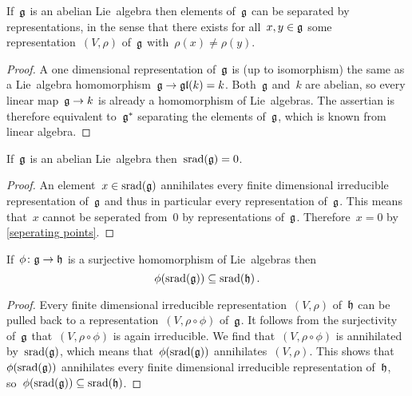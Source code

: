 \begin{lemma}
  \label{seperating points}
  If~$\mathfrak{g}$ is an abelian Lie~algebra then elements of~$\mathfrak{g}$ can be separated by {\onedimensional} representations, in the sense that there exists for all~$x, y \in \mathfrak{g}$ some {\onedimensional} representation~$(V,\rho)$ of~$\mathfrak{g}$ with~$\rho(x) \neq \rho(y)$.
\end{lemma}

\begin{proof}
  A one dimensional representation of~$\mathfrak{g}$ is (up to isomorphism) the same as a Lie~algebra homomorphism~$\mathfrak{g} \to \mathfrak{gl}(k) = k$.
  Both~$\mathfrak{g}$ and~$k$ are abelian, so every linear map~$\mathfrak{g} \to k$ is already a homomorphism of Lie~algebras.
  The assertian is therefore equivalent to~$\mathfrak{g}^*$ separating the elements of~$\mathfrak{g}$, which is known from linear algebra.
\end{proof}

\begin{corollary}
  \label{abelian have zero srad}
  If~$\mathfrak{g}$ is an abelian Lie~algebra then~$\operatorname{srad}(\mathfrak{g}) = 0$.
\end{corollary}

\begin{proof}
  An element~$x \in \operatorname{srad}(\mathfrak{g})$ annihilates every finite dimensional irreducible representation of~$\mathfrak{g}$ and thus in particular every {\onedimensional} representation of~$\mathfrak{g}$.
  This means that~$x$ cannot be seperated from~$0$ by {\onedimensional} representations of~$\mathfrak{g}$.
  Therefore~$x = 0$ by \cref{seperating points}.
\end{proof}

\begin{lemma}
  \label{functoriality of srad}
  If~$\phi \colon \mathfrak{g} \to \mathfrak{h}$ is a surjective homomorphism of Lie~algebras then
  \[
    \phi(\operatorname{srad}(\mathfrak{g}))
    \subseteq
    \operatorname{srad}(\mathfrak{h})  \,.
  \]
\end{lemma}

\begin{proof}
  Every finite dimensional irreducible representation~$(V, \rho)$ of~$\mathfrak{h}$ can be pulled back to a representation~$(V, \rho \circ \phi)$ of~$\mathfrak{g}$.
  It follows from the surjectivity of~$\mathfrak{g}$ that~$(V, \rho \circ \phi)$ is again irreducible.
  We find that~$(V, \rho \circ \phi)$ is annihilated by~$\operatorname{srad}(\mathfrak{g})$, which means that~$\phi(\operatorname{srad}(\mathfrak{g}))$ annihilates~$(V, \rho)$.
  This shows that~$\phi(\operatorname{srad}(\mathfrak{g}))$ annihilates every finite dimensional irreducible representation of~$\mathfrak{h}$, so~$\phi(\operatorname{srad}(\mathfrak{g})) \subseteq \operatorname{srad}(\mathfrak{h})$.
\end{proof}

